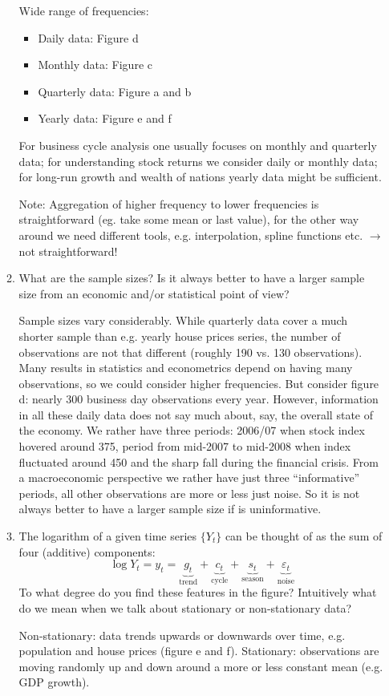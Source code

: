 \documentclass[a4paper]{scrartcl}
\begin{document}
\begin{enumerate}
\begin{enumerate}
\begin{solution}
			Wide range of frequencies:
			\begin{itemize}
				\item Daily data: Figure d
				\item Monthly data: Figure c
				\item Quarterly data: Figure a and b
				\item Yearly data: Figure e and f
			\end{itemize}
		For business cycle analysis one usually focuses on monthly and quarterly data; for understanding stock returns we consider daily or monthly data; for long-run growth and wealth of nations yearly data might be sufficient.
		
		Note: Aggregation of higher frequency to lower frequencies is straightforward (eg. take some mean or last value), for the other way around we need different tools, e.g. interpolation, spline functions etc. $\rightarrow$ not straightforward!
		\end{solution}
	
		\item What are the sample sizes? Is it always better to have a larger sample size from an economic and/or statistical point of view?
		\begin{solution}
			Sample sizes vary considerably. While quarterly data cover a much shorter sample than e.g. yearly house prices series, the number of observations are not that different (roughly 190 vs. 130 observations). Many results in statistics and econometrics depend on having many observations, so we could consider higher frequencies. But consider figure d: nearly 300 business day observations every year. However, information in all these daily data does not say much about, say, the overall state of the economy. We rather have three periods: 2006/07 when stock index hovered around 375, period from mid-2007 to mid-2008 when index fluctuated around 450 and the sharp fall during the financial crisis. From a macroeconomic perspective we rather have just three \enquote{informative} periods, all other observations are more or less just noise. So it is not always better to have a larger sample size if is uninformative.
		\end{solution}
	
		\item The logarithm of a given time series $\{Y_t\}$ can be thought of as the sum of four (additive) components:
		$$ \log{Y_t} =y_t = \underbrace{g_t}_\text{trend} + \underbrace{c_t}_\text{cycle} + \underbrace{s_t}_\text{season} + \underbrace{\varepsilon_t}_\text{noise}$$
		To what degree do you find these features in the figure? Intuitively what do we mean when we talk about stationary or non-stationary data?
		\begin{solution}
			Non-stationary: data trends upwards or downwards over time, e.g. population and house prices (figure e and f). Stationary: observations are moving randomly up and down around a more or less constant mean (e.g. GDP growth).
			

\end{solution}
\end{enumerate}
\end{enumerate}
\end{document}
